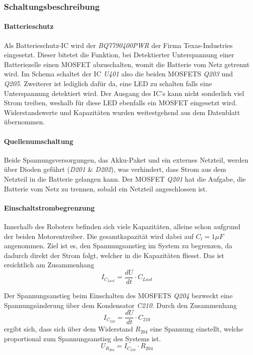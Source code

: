 \documentclass[main.tex]{subfiles} %
\begin{document}
\subsubsection*{Schaltungsbeschreibung}

\paragraph{Batterieschutz}
Als Batterieschutz-IC wird der \textit{BQ7790400PWR} der Firma Texas-Industries
eingesetzt. Dieser bitetet die Funktion, bei Detektierter Unterspannung einer
Batteriezelle einen MOSFET abzuschalten, womit die Batterie vom Netz getrennt
wird. Im Schema schaltet der IC \textit{U401} also die beiden MOSFETS
\textit{Q203} und \textit{Q205}. Zweiterer ist lediglich dafür da, eine LED zu
schalten falls eine Unterspannung detektiert wird. Der Ausgang des IC's kann
nicht sonderlich viel Strom treiben, weshalb für diese LED ebenfalls ein MOSFET
eingesetzt wird. Widerstandswerte und Kapazitäten wurden weitestgehend aus dem
Datenblatt übernommen.

\paragraph{Quellenumschaltung}
Beide Spannungsversorgungen, das Akku-Paket und ein externes Netzteil, werden
über Dioden geführt (\textit{D201} \& \textit{D202}), was verhindert, dass
Strom aus dem Netzteil in die Batterie gelangen kann. Der MOSFET \textit{Q201}
hat die Aufgabe, die Batterie vom Netz zu trennen, sobald ein Netzteil
angeschlossen ist.

\paragraph{Einschaltstrombegrenzung}
Innerhalb des Roboters befinden sich viele Kapazitäten, alleine schon aufgrund
der beiden Motorentreiber. Die gesamtkapazität wird dabei auf $C_l = 1 \mu F$
angenommen. Ziel ist es, den Spannungsanstieg im System zu begrenzen, da
dadurch direkt der Strom folgt, welcher in die Kapazitäten fliesst. Das ist
ersichtlich am Zusammenhang
\[
    I_{C_{Last}}  = \frac{dU}{dt} \cdot C_{Last}
\]

Der Spannungsanstieg beim Einschalten des MOSFETS \textit{Q204} bezweckt eine
Spannungsänderung über dem Kondensator \textit{C210}. Durch den Zusammenhang
\[
    I_{C_{210}}  = \frac{dU}{dt} \cdot C_{210}
\]
ergibt sich, dass sich über dem Widerstand $R_{204}$ eine Spannung einstellt,
welche proportional zum Spannungsanstieg des Systems ist.
\[
    U_{R_{204}} = I_{C_{210}} \cdot R_{204}
\]
\end{document}
